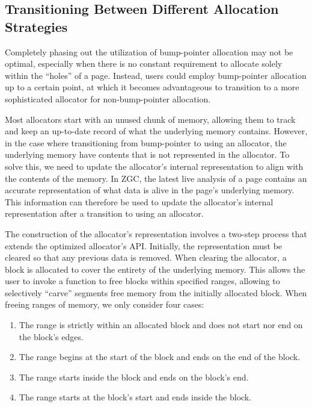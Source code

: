 
\subsection{Transitioning Between Different Allocation Strategies}

Completely phasing out the utilization of bump-pointer allocation may not be optimal, especially when there is no constant requirement to allocate solely within the ``holes'' of a page. Instead, users could employ bump-pointer allocation up to a certain point, at which it becomes advantageous to transition to a more sophisticated allocator for non-bump-pointer allocation.

Most allocators start with an unused chunk of memory, allowing them to track and keep an up-to-date record of what the underlying memory contains. However, in the case where transitioning from bump-pointer to using an allocator, the underlying memory have contents that is not represented in the allocator. To solve this, we need to update the allocator's internal representation to align with the contents of the memory. In ZGC, the latest live analysis of a page contains an accurate representation of what data is alive in the page's underlying memory. This information can therefore be used to update the allocator's internal representation after a transition to using an allocator.

The construction of the allocator's representation involves a two-step process that extends the optimized allocator's API. Initially, the representation must be cleared so that any previous data is removed. When clearing the allocator, a block is allocated to cover the entirety of the underlying memory. This allows the user to invoke a function to free blocks within specified ranges, allowing to selectively ``carve'' segments free memory from the initially allocated block. When freeing ranges of memory, we only consider four cases: 

\begin{enumerate}
    \item The range is strictly within an allocated block and does not start nor end on the block's edges.
    \item The range begins at the start of the block and ends on the end of the block.
    \item The range starts inside the block and ends on the block's end.
    \item The range starts at the block's start and ends inside the block.
\end{enumerate}

